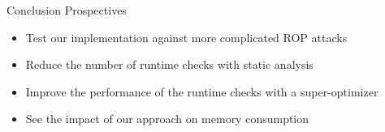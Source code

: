 \documentclass{beamer}
\begin{document}
\begin{frame}[c]{Conclusion}
	Prospectives
	\begin{itemize}
		\item Test our implementation against more complicated ROP attacks
		\item Reduce the number of runtime checks with static analysis
		\item Improve the performance of the runtime checks with a super-optimizer
		\item See the impact of our approach on memory consumption
	\end{itemize}
\end{frame}

 
\end{document}
